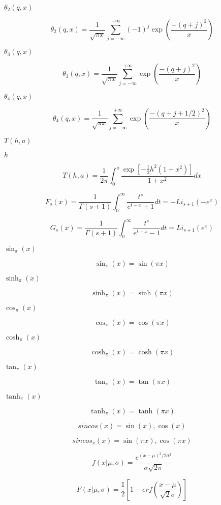 \documentclass{article}
\begin{document}
$ \theta_2(q,x) $
\pagebreak

\[ \theta_2(q,x) = \frac{1}{\sqrt{\pi x}} \sum_{j=-\infty}^{+\infty} (-1)^j \exp\left( \frac{-(q + j)^2}{x} \right) \]
\pagebreak

$ \theta_3(q,x) $
\pagebreak

\[ \theta_3(q,x) = \frac{1}{\sqrt{\pi x}} \sum_{j=-\infty}^{+\infty} \exp\left( \frac{-(q+j)^2}{x} \right) \]
\pagebreak

$ \theta_4(q,x) $
\pagebreak

\[ \theta_4(q,x) = \frac{1}{\sqrt{\pi x}} \sum_{j=-\infty}^{+\infty} \exp\left( \frac{-(q + j + 1/2)^2}{x} \right) \]
\pagebreak

$ T(h,a) $
\pagebreak

$ h $
\pagebreak

\[ T(h,a) = \frac{1}{2\pi}\int_0^a \frac{\exp\left[-\frac{1}{2}h^2(1+x^2)\right]}{1+x^2} dx \]
\pagebreak

\[ F_s(x) = \frac{1}{\Gamma(s+1)}\int_0^\infty \frac{t^s}{e^{t-x} + 1}dt = -Li_{s+1}(-e^x) \]
\pagebreak

\[ G_s(x) = \frac{1}{\Gamma(s+1)}\int_0^\infty \frac{t^s}{e^{t-x} - 1}dt = Li_{s+1}(e^x) \]
\pagebreak

$ \sin_\pi(x) $
\pagebreak

\[ \sin_\pi(x) = \sin(\pi x) \]
\pagebreak

$ \sinh_\pi(x) $
\pagebreak

\[ \sinh_\pi(x) = \sinh(\pi x) \]
\pagebreak

$ \cos_\pi(x) $
\pagebreak

\[ \cos_\pi(x) = \cos(\pi x) \]
\pagebreak

$ \cosh_\pi(x) $
\pagebreak

\[ \cosh_\pi(x) = \cosh(\pi x) \]
\pagebreak

$ \tan_\pi(x) $
\pagebreak

\[ \tan_\pi(x) = \tan(\pi x) \]
\pagebreak

$ \tanh_\pi(x) $
\pagebreak

\[ \tanh_\pi(x) = \tanh(\pi x) \]
\pagebreak

\[ sincos(x) = {\sin(x), \cos(x)} \]
\pagebreak

\[ sincos_\pi(x) = {\sin(\pi x), \cos(\pi x)} \]
\pagebreak

\[ f(x|\mu,\sigma) = \frac{e^{(x-\mu)^2/2\sigma^2}}{\sigma\sqrt{2\pi}} \]
\pagebreak

\[ F(x|\mu,\sigma) = \frac{1}{2}\left[ 1-erf(\frac{x-\mu}{\sqrt{2}\sigma}) \right] \]
\pagebreak
\end{document}
